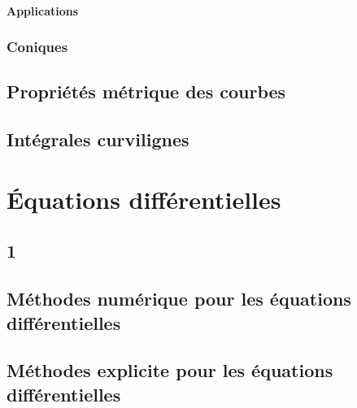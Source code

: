 \subsection{Applications}
\section{Coniques}
\chapter{Propriétés métrique des courbes}
\chapter{Intégrales curvilignes}
\part{Équations différentielles}
\chapter{1}
\chapter{Méthodes numérique pour les équations différentielles}
\chapter{Méthodes explicite pour les équations différentielles}
